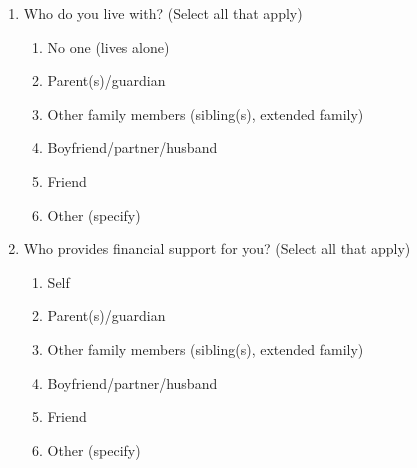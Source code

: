 \begin{enumerate}
\begin{enumerate}
\begin{enumerate}
        \end{enumerate}
        \item Who do you live with? (Select all that apply)
        \begin{enumerate}
            \item No one (lives alone)
            \item Parent(s)/guardian
            \item Other family members (sibling(s), extended family)
            \item Boyfriend/partner/husband
            \item Friend
            \item Other (specify)
        \end{enumerate}
        \item Who provides financial support for you? (Select all that apply)
        \begin{enumerate}
            \item Self
            \item Parent(s)/guardian
            \item Other family members (sibling(s), extended family)
            \item Boyfriend/partner/husband
            \item Friend
            \item Other (specify)
        \end{enumerate}
    \end{enumerate}


\end{enumerate}
